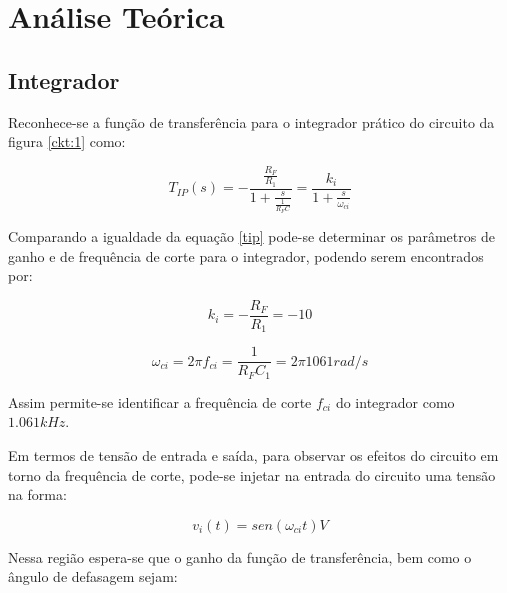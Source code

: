 \section{Análise Teórica}

\subsection{Integrador}

Reconhece-se a função de transferência para o integrador prático do circuito da figura \ref{ckt:1} como:

\begin{center}
\begin{equation} \label{tip}
        T_{IP}(s) = - \frac{\frac{R_F}{R_1}}{1+\frac{s}{\frac{1}{R_FC}}} =  \frac{k_i}{1+\frac{s}{\omega_{ci}}}
\end{equation}
\end{center}

Comparando a igualdade da equação \ref{tip} pode-se determinar os parâmetros de ganho e de frequência de corte para o integrador, podendo serem encontrados por:

\begin{center}
\begin{equation} \label{tip:1}
         k_i = - \frac{R_F}{R_1} = -10
\end{equation}
\end{center}

\begin{center}
\begin{equation} \label{tip:2}
       \omega_{ci} = 2 \pi f_{ci} = \frac{1}{R_FC_1} = 2 \pi 1061 rad/s
\end{equation}
\end{center}

Assim permite-se identificar a frequência de corte $f_{ci}$ do integrador como $1.061kHz$.

Em termos de tensão de entrada e saída, para observar os efeitos do circuito em torno da frequência de corte, pode-se injetar na entrada do circuito uma tensão na forma:

\begin{center}
\begin{equation} \label{int:1}
       v_i(t) = sen(\omega_{ci}t) V
\end{equation}
\end{center}

Nessa região espera-se que o ganho da função de transferência, bem como o ângulo de defasagem sejam:

